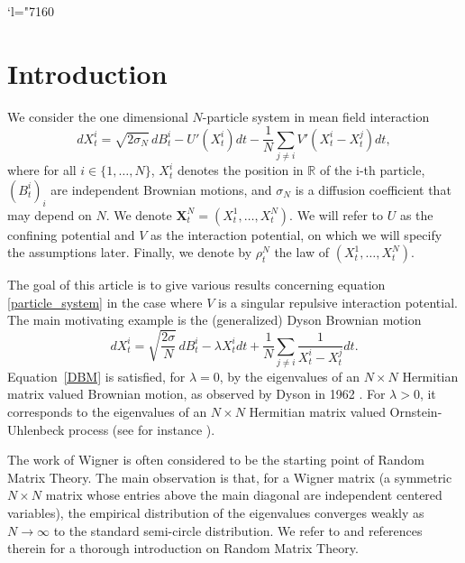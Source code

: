 \documentclass[11pt]{article}
\newcommand{\Changel}{\mathcode`l="7160}
\newcommand{\bX}{{\boldsymbol{X}}}
\theoremstyle{plain}
\theoremstyle{definition}
\begin{document}
\Changel

\section{Introduction}

We consider the one dimensional $N$-particle system in mean field interaction\vspace*{-3pt}
\begin{equation}\label{particle_system}
dX^i_t=\sqrt{2\sigma_N}\,dB^i_t-U'\left(X^i_t\right)dt-\frac{1}{N}\sum_{j\neq i}V'(X^i_t-X^j_t)dt,
\end{equation}
where for all $i\in\{1,\dots,N\}$, $X^i_t$ denotes the position in $\mathbb{R}$ of the i-th particle, $(B^i_t)_i$ are independent Brownian motions, and $\sigma_N$ is a diffusion coefficient that may depend on $N$. We denote $\bX^N_t=\left(X^1_t,\dots,X^N_t\right)$. We will refer to $U$ as the confining potential and $V$ as the interaction potential, on which we will specify the assumptions later. Finally, we denote by $\rho^N_t$ the law of $(X^1_t,\dots,X^N_t)$.

The goal of this article is to give various results concerning equation \eqref{particle_system} in the case where $V$ is a singular repulsive interaction potential. The main motivating example is the (generalized) Dyson Brownian motion\vspace*{-3pt}
\begin{equation}\label{DBM}
dX^i_t=\sqrt{\frac{2\sigma}{N}}\,dB^i_t-\lambda X^i_tdt+\frac{1}{N}\sum_{j\neq i}\frac{1}{X^i_t-X^j_t}dt.
\end{equation}
Equation~\eqref{DBM} is satisfied, for $\lambda=0$, by the eigenvalues of an $N\times N$ Hermitian matrix valued Brownian motion, as observed by Dyson in 1962 \cite{Dyson}. For $\lambda>0$, it corresponds to the eigenvalues of an $N\times N$ Hermitian matrix valued Ornstein-Uhlenbeck process (see for instance \cite{Chan92, Rogers_Shi}).

The work of Wigner \cite{Wigner} is often considered to be the starting point of Random Matrix Theory. The main observation is that, for a Wigner matrix (a symmetric $N\times N$ matrix whose entries above the main diagonal are independent centered variables), the empirical distribution of the eigenvalues converges weakly as $N\to\infty$ to the standard semi-circle distribution. We refer to \cite{anderson_guionnet_zeitouni_2009} and references therein for a thorough introduction on Random Matrix Theory.
\end{document}

